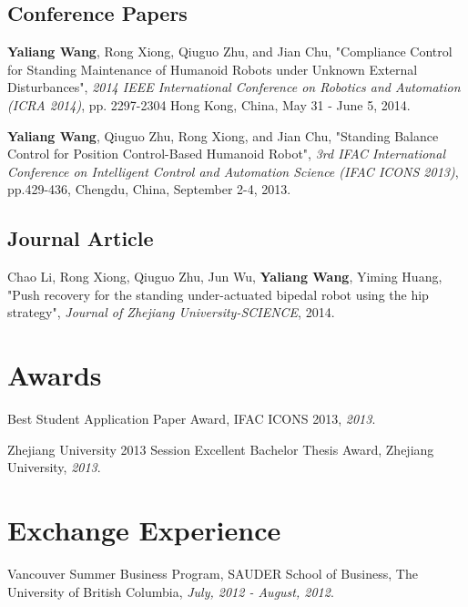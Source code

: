 \documentclass[letterpaper]{article}
\renewenvironment{itemize}{
  \begin{list}{}{
    \setlength{\leftmargin}{1.5em}
  }
}{
  \end{list}
}
\begin{document}
\subsection*{Conference Papers}
\begin{itemize}
\item \textbf{Yaliang Wang}, Rong Xiong, Qiuguo Zhu, and Jian Chu, 
  "Compliance Control for Standing Maintenance of Humanoid Robots under Unknown External Disturbances",
  {\it 2014 IEEE International Conference on Robotics and Automation (ICRA 2014)}, pp. 2297-2304
  Hong Kong, China, May 31 - June 5, 2014.
\item \textbf{Yaliang Wang}, Qiuguo Zhu, Rong Xiong, and Jian Chu, 
  "Standing Balance Control for Position Control-Based Humanoid Robot",
  {\it 3rd IFAC International Conference on Intelligent Control and Automation Science (IFAC ICONS 2013)}, pp.429-436, Chengdu, China, September 2-4, 2013.
\end{itemize}

\subsection*{Journal Article}
\begin{itemize}
\item Chao Li, Rong Xiong, Qiuguo Zhu, Jun Wu, \textbf{Yaliang Wang}, Yiming Huang, "Push recovery for the standing under-actuated bipedal robot using the hip strategy", {\it Journal of Zhejiang University-SCIENCE}, 2014.
\end{itemize}

\section*{Awards}

\begin{itemize}
  \item Best Student Application Paper Award, IFAC ICONS 2013, {\it  2013}.
  \item Zhejiang University 2013 Session Excellent Bachelor Thesis Award, Zhejiang University, {\it  2013}.
\end{itemize}

\section*{Exchange Experience}

\begin{itemize}
  \item Vancouver Summer Business Program, 
   SAUDER School of Business, The University of British Columbia, {\it  July, 2012 - August, 2012}.
\end{itemize}
\end{document}
